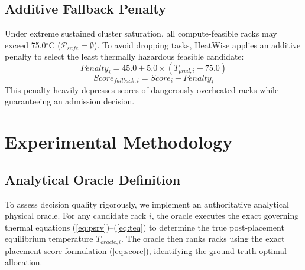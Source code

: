 \documentclass[conference,10pt]{IEEEtran}
\begin{document}
\subsection{Additive Fallback Penalty}
Under extreme sustained cluster saturation, all compute-feasible racks may exceed 75.0$^\circ$C ($\mathcal{P}_{safe} = \emptyset$). To avoid dropping tasks, HeatWise applies an additive penalty to select the least thermally hazardous feasible candidate:
\begin{equation}
\label{eq:penalty}
Penalty_i = 45.0 + 5.0 \times (T_{pred,i} - 75.0)
\end{equation}
\begin{equation}
Score_{fallback,i} = Score_i - Penalty_i
\end{equation}
This penalty heavily depresses scores of dangerously overheated racks while guaranteeing an admission decision.

\section{Experimental Methodology}
\label{sec:methodology}

\subsection{Analytical Oracle Definition}
To assess decision quality rigorously, we implement an authoritative analytical physical oracle. For any candidate rack $i$, the oracle executes the exact governing thermal equations (\ref{eq:psrv})--(\ref{eq:teq}) to determine the true post-placement equilibrium temperature $T_{oracle,i}$. The oracle then ranks racks using the exact placement score formulation (\ref{eq:score}), identifying the ground-truth optimal allocation.
\end{document}
